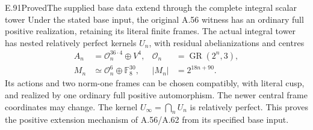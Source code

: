 \begin{result}{E.91}{Proved}{The supplied base data extend through the complete integral scalar tower}
Under the stated base input, the original A.56 witness has an
ordinary full positive realization, retaining its literal finite
frames.  The actual integral tower has nested relatively perfect
kernels \(U_n\), with residual abelianizations and centres
\[
 \begin{aligned}
 A_n&=\mathcal O_n^{36\cdot4}\oplus V^4,
       &\mathcal O_n&=\operatorname{GR}(2^n,3),\\
 M_n&\simeq\mathcal O_n^6\oplus\mathbb F_8^{30},
       &|M_n|&=2^{18n+90}.
 \end{aligned}                                          \tag{E.91.1}
\]
Its actions and two norm-one frames can be chosen compatibly,
with literal cusp, and realized by one ordinary full positive
automorphism.  The newer central frame coordinates may change.
The kernel \(U_\infty=\bigcap_nU_n\) is relatively perfect.
This proves the positive extension mechanism of A.56/A.62
from its specified base input.
\end{result}
